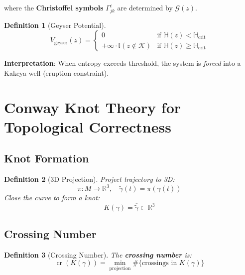 \documentclass[12pt]{article}
\newtheorem{definition}{Definition}
\begin{document}
where the \textbf{Christoffel symbols} $\Gamma^i_{jk}$ are determined by $\mathcal{G}(z)$.

\begin{definition}[Geyser Potential]
\begin{equation}
V_{\text{geyser}}(z) =
\begin{cases}
0 & \text{if } \mathbb{H}(z) < \mathbb{H}_{\text{crit}} \\
+\infty \cdot \mathbb{I}(z \notin \mathcal{K}) & \text{if } \mathbb{H}(z) \ge \mathbb{H}_{\text{crit}}
\end{cases}
\end{equation}
\end{definition}

\textbf{Interpretation}: When entropy exceeds threshold, the system is \emph{forced} into a Kakeya well (eruption constraint).

\section{Conway Knot Theory for Topological Correctness}

\subsection{Knot Formation}

\begin{definition}[3D Projection]
Project trajectory to 3D:
\begin{equation}
\pi: M \to \mathbb{R}^3, \quad \tilde{\gamma}(t) = \pi(\gamma(t))
\end{equation}
Close the curve to form a knot:
\begin{equation}
K(\gamma) = \overline{\tilde{\gamma}} \subset \mathbb{R}^3
\end{equation}
\end{definition}

\subsection{Crossing Number}

\begin{definition}[Crossing Number]
The \textbf{crossing number} is:
\begin{equation}
\operatorname{cr}(K(\gamma)) = \min_{\text{projection}} \#\{\text{crossings in } K(\gamma)\}
\end{equation}
\end{definition}
\end{document}
